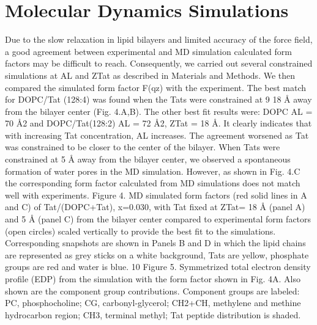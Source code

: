 \section{Molecular Dynamics Simulations}
Due to the slow relaxation in lipid bilayers and limited accuracy of the force field, a good
agreement between experimental and MD simulation calculated form factors may be difficult to
reach. Consequently, we carried out several constrained simulations at AL and ZTat as described
in Materials and Methods. We then compared the simulated form factor F(qz) with the
experiment. The best match for DOPC/Tat (128:4) was found when the Tats were constrained at
9
18 Å away from the bilayer center (Fig. 4.A,B). The other best fit results were: DOPC AL = 70
Å2 and DOPC/Tat(128:2) AL = 72 Å2, ZTat = 18 Å. It clearly indicates that with increasing Tat
concentration, AL increases. The agreement worsened as Tat was constrained to be closer to the
center of the bilayer. When Tats were constrained at 5 Å away from the bilayer center, we
observed a spontaneous formation of water pores in the MD simulation. However, as shown in
Fig. 4.C the corresponding form factor calculated from MD simulations does not match well
with experiments.
Figure 4. MD simulated form factors (red solid lines in A and C) of Tat/(DOPC+Tat), x=0.030,
with Tat fixed at ZTat= 18 Å (panel A) and 5 Å (panel C) from the bilayer center compared to
experimental form factors (open circles) scaled vertically to provide the best fit to the
simulations. Corresponding snapshots are shown in Panels B and D in which the lipid chains are
represented as grey sticks on a white background, Tats are yellow, phosphate groups are red and
water is blue.
10
Figure 5. Symmetrized total electron density profile (EDP) from the simulation with the form
factor shown in Fig. 4A. Also shown are the component group contributions. Component groups
are labeled: PC, phosphocholine; CG, carbonyl-glycerol; CH2+CH, methylene and methine
hydrocarbon region; CH3, terminal methyl; Tat peptide distribution is shaded.


